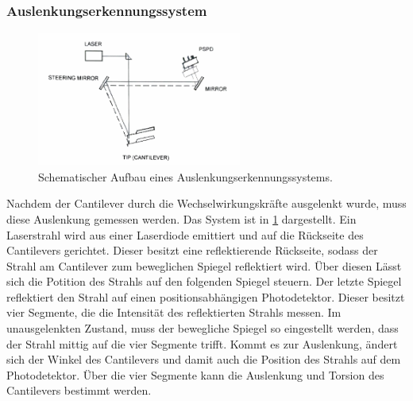 \subsubsection{Auslenkungserkennungssystem}
\begin{figure}
    \centering
    \includegraphics[width=0.6\textwidth]{../assets/messmethoden/afm/02_beam.png}
    \caption{Schematischer Aufbau eines Auslenkungserkennungssystems. }
    \label{fig:afm-beam}
\end{figure}
Nachdem der Cantilever durch die Wechselwirkungskräfte ausgelenkt wurde, muss diese Auslenkung gemessen werden.
Das System ist in \cref{fig:afm-beam} dargestellt.
Ein Laserstrahl wird aus einer Laserdiode emittiert und auf die Rückseite des Cantilevers gerichtet.
Dieser besitzt eine reflektierende Rückseite, sodass der Strahl am Cantilever zum beweglichen Spiegel reflektiert wird.
Über diesen Lässt sich die Potition des Strahls auf den folgenden Spiegel steuern.
Der letzte Spiegel reflektiert den Strahl auf einen positionsabhängigen Photodetektor.
Dieser besitzt vier Segmente, die die Intensität des reflektierten Strahls messen.
Im unausgelenkten Zustand, muss der bewegliche Spiegel so eingestellt werden, dass der Strahl mittig auf die vier
Segmente trifft.
Kommt es zur Auslenkung, ändert sich der Winkel des Cantilevers und damit auch die Position des Strahls auf dem
Photodetektor.
Über die vier Segmente kann die Auslenkung und Torsion des Cantilevers bestimmt werden.

